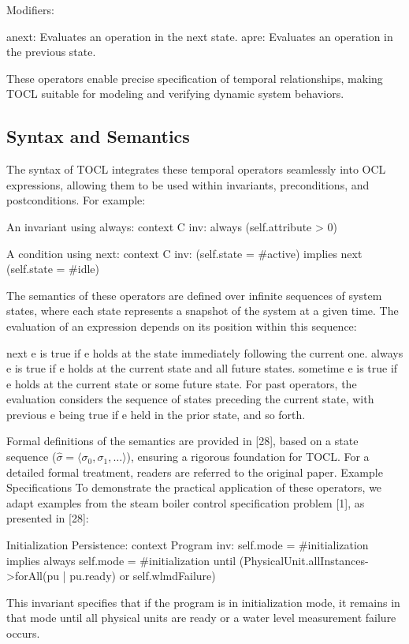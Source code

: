 Modifiers:

anext: Evaluates an operation in the next state.
apre: Evaluates an operation in the previous state.

These operators enable precise specification of temporal relationships, making TOCL suitable for modeling and verifying dynamic system behaviors.

\subsection{Syntax and Semantics}
The syntax of TOCL integrates these temporal operators seamlessly into OCL expressions, allowing them to be used within invariants, preconditions, and postconditions. For example:

An invariant using always:
context C inv:
  always (self.attribute > 0)


A condition using next:
context C inv:
  (self.state = \#active) implies next (self.state = \#idle)

The semantics of these operators are defined over infinite sequences of system states, where each state represents a snapshot of the system at a given time. The evaluation of an expression depends on its position within this sequence:

next e is true if e holds at the state immediately following the current one.
always e is true if e holds at the current state and all future states.
sometime e is true if e holds at the current state or some future state.
For past operators, the evaluation considers the sequence of states preceding the current state, with previous e being true if e held in the prior state, and so forth.

Formal definitions of the semantics are provided in [28], based on a state sequence ($\hat{\sigma} = \langle \sigma_0, \sigma_1, \ldots \rangle$), ensuring a rigorous foundation for TOCL. For a detailed formal treatment, readers are referred to the original paper.
Example Specifications
To demonstrate the practical application of these operators, we adapt examples from the steam boiler control specification problem [1], as presented in [28]:

Initialization Persistence:
context Program inv:
  self.mode = \#initialization implies
  always self.mode = \#initialization
  until (PhysicalUnit.allInstances->forAll(pu | pu.ready)
         or self.wlmdFailure)

This invariant specifies that if the program is in initialization mode, it remains in that mode until all physical units are ready or a water level measurement failure occurs.

